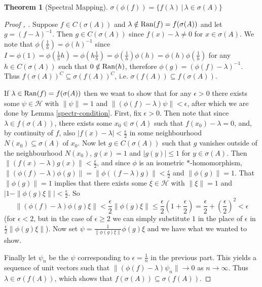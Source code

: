 \documentclass[12pt,oneside]{report}
\newtheorem{thm}{Theorem}[chapter]
\begin{document}
\begin{thm}[Spectral Mapping]
    $\sigma(\phi(f)) = \{ f(\lambda) \, | \, \lambda \in \sigma(A) \}$
\end{thm}
\begin{proof}[Proof \cite{Reed_Simon_1980}, \cite{ruy_answer_2020}]
    Suppose $f \in C(\sigma(A))$ and $\lambda \notin \mathrm{Ran}(f) = f(\sigma(A))$ and let $g = (f - \lambda)^{-1}$. Then $g \in C(\sigma(A))$ since $f(x) - \lambda \neq 0$ for $x \in \sigma(A)$. We note that $\phi\left( \frac{1}{h} \right) = \phi(h)^{-1}$ since $I = \phi(1) = \phi\left( \frac{1}{h} h \right) = \phi\left( h \frac{1}{h} \right) = \phi\left( \frac{1}{h} \right) \phi(h) = \phi(h) \phi\left( \frac{1}{h} \right)$ for any $h \in C(\sigma(A))$ such that $0 \notin \mathrm{Ran}(h)$, therefore $\phi(g) = (\phi(f) - \lambda)^{-1}$. Thus $f(\sigma(A))^{C} \subseteq \sigma(f(A))^{C}$, i.e. $\sigma(f(A)) \subseteq f(\sigma(A))$.

    If $\lambda \in \mathrm{Ran}(f) = f(\sigma(A))$ then we want to show that for any $\epsilon > 0$ there exists some $\psi \in \mathscr{H}$ with $\|\psi\| = 1$ and $\|(\phi(f) - \lambda)\psi\| < \epsilon$, after which we are done by Lemma \ref{spectr-condition}. First, fix $\epsilon > 0$. Then note that since $\lambda \in f(\sigma(A))$, there exists some $x_0 \in \sigma(A)$ such that $f(x_0) - \lambda = 0$, and, by continuity of $f$, also $|f(x) - \lambda| < \frac{\epsilon}{2}$ in some neighbourhood $N(x_0) \subseteq \sigma(A)$ of $x_0$. Now let $g \in C(\sigma(A))$ such that $g$ vanishes outside of the neighbourhood $N(x_0)$, $g(x) = 1$ and $|g(y)| \leq 1$ for $y \in \sigma(A)$. Then $\|(f(x) - \lambda)g(x)\| < \frac{\epsilon}{2}$, and since $\phi$ is an isometric $*$-homomorphism, $\|(\phi(f) - \lambda)\phi(g)\| = \|\phi((f - \lambda)g)\| < \frac{\epsilon}{2}$ and $\|\phi(g)\| = 1$. That $\|\phi(g)\| = 1$ implies that there exists some $\xi \in \mathscr{H}$ with $\|\xi\| = 1$ and $|1 - \|\phi(g)\xi\|| < \frac{\epsilon}{2}$. So
    $$\|(\phi(f) - \lambda)\phi(g)\xi\| < \frac{\epsilon}{2}\|\phi(g)\xi\| \leq \frac{\epsilon}{2}\left( 1 + \frac{\epsilon}{2} \right) = \frac{\epsilon}{2} + \left( \frac{\epsilon}{2} \right)^{2} < \epsilon$$
    (for $\epsilon < 2$, but in the case of $\epsilon \geq 2$ we can simply substitute $1$ in the place of $\epsilon$ in $\frac{\epsilon}{2}\|\phi(g)\xi\|$). Now set $\psi = \frac{1}{\|\phi(g)\xi\|}\phi(g)\xi$ and we have what we wanted to show.

    Finally let $\psi_{n}$ be the $\psi$ corresponding to $\epsilon = \frac{1}{n}$ in the previous part. This yields a sequence of unit vectors such that $\|(\phi(f) - \lambda)\psi_{n}\| \to 0$ as $n \to \infty$. Thus $\lambda \in \sigma(f(A))$, which shows that $f(\sigma(A)) \subseteq \sigma(f(A))$.
\end{proof}
\end{document}
